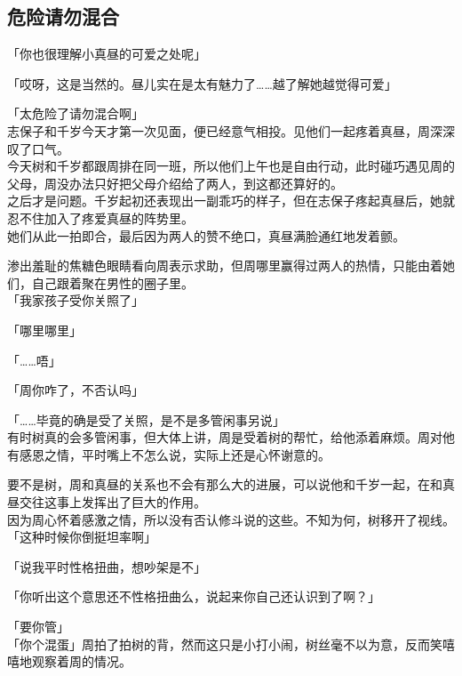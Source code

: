 \subsection{危险请勿混合}

「你也很理解小真昼的可爱之处呢」

「哎呀，这是当然的。昼儿实在是太有魅力了……越了解她越觉得可爱」

「太危险了请勿混合啊」\\

志保子和千岁今天才第一次见面，便已经意气相投。见他们一起疼着真昼，周深深叹了口气。\\

今天树和千岁都跟周排在同一班，所以他们上午也是自由行动，此时碰巧遇见周的父母，周没办法只好把父母介绍给了两人，到这都还算好的。\\

之后才是问题。千岁起初还表现出一副乖巧的样子，但在志保子疼起真昼后，她就忍不住加入了疼爱真昼的阵势里。\\

她们从此一拍即合，最后因为两人的赞不绝口，真昼满脸通红地发着颤。

渗出羞耻的焦糖色眼睛看向周表示求助，但周哪里赢得过两人的热情，只能由着她们，自己跟着聚在男性的圈子里。\\

「我家孩子受你关照了」

「哪里哪里」

「……唔」

「周你咋了，不否认吗」

「……毕竟的确是受了关照，是不是多管闲事另说」\\

有时树真的会多管闲事，但大体上讲，周是受着树的帮忙，给他添着麻烦。周对他有感恩之情，平时嘴上不怎么说，实际上还是心怀谢意的。

要不是树，周和真昼的关系也不会有那么大的进展，可以说他和千岁一起，在和真昼交往这事上发挥出了巨大的作用。\\

因为周心怀着感激之情，所以没有否认修斗说的这些。不知为何，树移开了视线。\\

「这种时候你倒挺坦率啊」

「说我平时性格扭曲，想吵架是不」

「你听出这个意思还不性格扭曲么，说起来你自己还认识到了啊？」

「要你管」\\

「你个混蛋」周拍了拍树的背，然而这只是小打小闹，树丝毫不以为意，反而笑嘻嘻地观察着周的情况。

